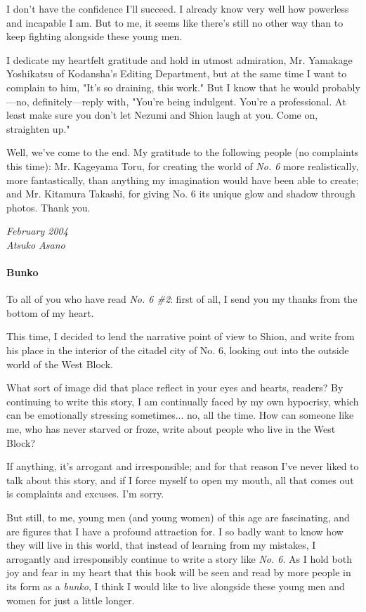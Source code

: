 I don't have the confidence I'll succeed. I already know very well how
powerless and incapable I am. But to me, it seems like there's still no
other way than to keep fighting alongside these young men.

I dedicate my heartfelt gratitude and hold in utmost admiration, Mr.
Yamakage Yoshikatsu of Kodansha's Editing Department, but at the same
time I want to complain to him, "It's so draining, this work." But I
know that he would probably---no, definitely---reply with, "You're being
indulgent. You're a professional. At least make sure you don't let
Nezumi and Shion laugh at you. Come on, straighten up."

Well, we've come to the end. My gratitude to the following people (no
complaints this time): Mr. Kageyama Toru, for creating the world of \emph{No.
6} more realistically, more fantastically, than anything my imagination
would have been able to create; and Mr. Kitamura Takashi, for giving No.
6 its unique glow and shadow through photos. Thank you.

\myspace

\emph{February 2004\\
Atsuko Asano}

\paragraph{Bunko}

To all of you who have read \emph{No. 6 \#2}: first of all, I send you my
thanks from the bottom of my heart.

This time, I decided to lend the narrative point of view to Shion, and
write from his place in the interior of the citadel city of No. 6,
looking out into the outside world of the West Block.

What sort of image did that place reflect in your eyes and hearts,
readers? By continuing to write this story, I am continually faced by my
own hypocrisy, which can be emotionally stressing sometimes... no, all
the time. How can someone like me, who has never starved or froze, write
about people who live in the West Block?

If anything, it's arrogant and irresponsible; and for that reason I've
never liked to talk about this story, and if I force myself to open my
mouth, all that comes out is complaints and excuses. I'm sorry.

But still, to me, young men (and young women) of this age are
fascinating, and are figures that I have a profound attraction for. I so
badly want to know how they will live in this world, that instead of
learning from my mistakes, I arrogantly and irresponsibly continue to
write a story like \emph{No. 6}. As I hold both joy and fear in my heart that
this book will be seen and read by more people in its form as a \emph{bunko}, I
think I would like to live alongside these young men and women for just
a little longer.


